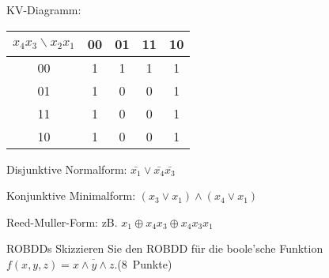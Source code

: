 \documentclass{exercisesheet}
\begin{document}
\begin{solutions}
  \item KV-Diagramm:
  \begin{tabular}{c|cccc}
    $x_4x_3\backslash x_2x_1$ & 00 & 01 & 11 & 10 \\
    \hline
    00                        & 1  & 1  & 1  & 1  \\
    01                        & 1  & 0  & 0  & 1  \\
    11                        & 1  & 0  & 0  & 1  \\
    10                        & 1  & 0  & 0  & 1  \\
  \end{tabular}\par
  Disjunktive Normalform: $\bar{x_1}\lor\bar{x_4}\bar{x_3}$
  \item Konjunktive Minimalform: $(x_3\lor x_1)\land(x_4\lor x_1)$
  \item Reed-Muller-Form: zB. $x_1\oplus x_4x_3\oplus x_4x_3x_1$
\end{solutions}

\begin{exercise}{ROBDDs}
  Skizzieren Sie den ROBDD für die boole’sche Funktion $f (x, y, z) = \overline{x \land y \land z}$.\hfill (8~Punkte)

  \begin{solution}
  \end{solution}
\end{exercise}
\end{document}
